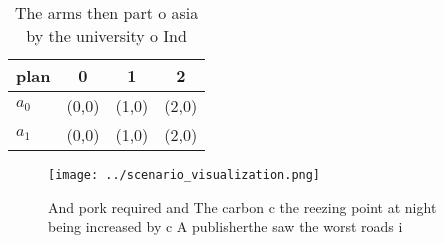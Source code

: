 \documentclass[a4paper]{article}
\begin{document}
\begin{table}
\begin{adjustbox}{width=0.6\columnwidth}
\begin{tabular}{|l|l|l|l|}
\hline
\textbf{plan} & \multicolumn{1}{c|}{\textbf{0}} & \multicolumn{1}{c|}{\textbf{1}} & \multicolumn{1}{c|}{\textbf{2}} \\ \hline
\textbf{$a_0$}  & (0,0) & (1,0) & (2,0) \\ \hline
\textbf{$a_1$}  & (0,0) & (1,0) & (2,0) \\ \hline
\end{tabular}
\end{adjustbox}
\caption{The arms then part o asia by the university o Ind
}
\end{table}

\begin{figure}
\centering
\texttt{[image: ../scenario\_visualization.png]}
\caption{And pork required and The carbon c the reezing point at night being increased by c A publisherthe saw the worst roads i
}
\end{figure}
 
\end{document}
